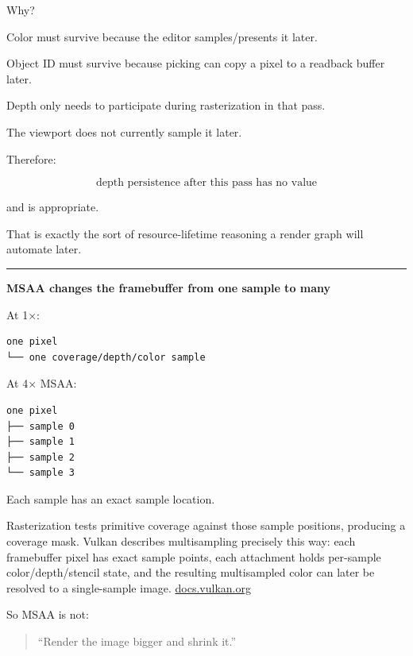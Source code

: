 Why?

Color must survive because the editor samples/presents it later.

Object ID must survive because picking can copy a pixel to a readback buffer later.

Depth only needs to participate during rasterization in that pass.

The viewport does not currently sample it later.

Therefore:

\[
\boxed{
\text{depth persistence after this pass has no value}
}
\]

and  is appropriate.

That is exactly the sort of resource-lifetime reasoning a render graph will automate later.

\begin{center}\rule{0.5\linewidth}{0.5pt}\end{center}

\textbf{MSAA changes the framebuffer from one sample to many}

At 1×:

\begin{verbatim}
one pixel
└── one coverage/depth/color sample
\end{verbatim}

At 4× MSAA:

\begin{verbatim}
one pixel
├── sample 0
├── sample 1
├── sample 2
└── sample 3
\end{verbatim}

Each sample has an exact sample location.

Rasterization tests primitive coverage against those sample positions, producing a coverage mask. Vulkan describes multisampling precisely this way: each framebuffer pixel has  exact sample points, each attachment holds per-sample color/depth/stencil state, and the resulting multisampled color can later be resolved to a single-sample image. \href{https://docs.vulkan.org/spec/latest/chapters/primsrast.html?utm_source=chatgpt.com}{docs.vulkan.org}

So MSAA is not:

\begin{quote}
``Render the image bigger and shrink it.''
\end{quote}

